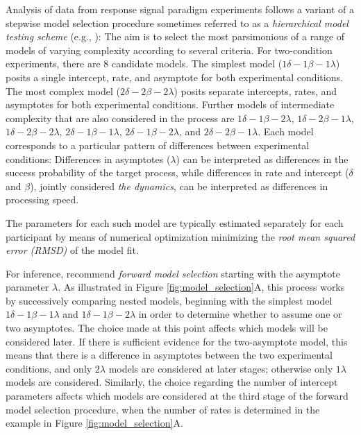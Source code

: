 \documentclass[10pt,letterpaper]{article}
\begin{document}
Analysis of data from response signal paradigm experiments follows a variant of a stepwise model selection procedure sometimes referred to as a \textit{hierarchical model testing scheme} (e.g., ):
The aim is to select the most parsimonious of a range of models of varying complexity according to several criteria. For two-condition experiments, there are 8 candidate models. The simplest model (\(1\delta-1\beta-1\lambda\)) posits a single intercept, rate, and asymptote for both experimental conditions. The most complex model (\(2\delta-2\beta-2\lambda\)) posits separate intercepts, rates, and asymptotes for both experimental conditions. Further models of intermediate complexity that are also considered in the process are \(1\delta-1\beta-2\lambda\), \(1\delta-2\beta-1\lambda\), \(1\delta-2\beta-2\lambda\),
\(2\delta-1\beta-1\lambda\), \(2\delta-1\beta-2\lambda\), and
\(2\delta-2\beta-1\lambda\).
Each model corresponds to a particular pattern of differences between experimental conditions: Differences in asymptotes ($\lambda$) can be interpreted as differences in the success probability of the target process, while differences in rate and intercept ($\delta$ and $\beta$), jointly considered \textit{the dynamics}, can be interpreted as differences in processing speed. 

The parameters for each such model are typically estimated separately for each participant by means of numerical optimization minimizing the \textit{root mean squared error (RMSD)} of the model fit. 

For inference,  recommend \textit{forward model selection} starting with the asymptote parameter $\lambda$. As illustrated in Figure \ref{fig:model_selection}A, this process works by successively comparing nested models, beginning with the simplest model \(1\delta-1\beta-1\lambda\) and \(1\delta-1\beta-2\lambda\) in order to determine whether to assume one or two asymptotes. The choice made at this point affects which models will be considered later. If there is sufficient evidence for the two-asymptote model, this means that there is a difference in asymptotes between the two experimental conditions, and only \(2\lambda\) models are considered at later stages; otherwise only \(1\lambda\) models are considered. Similarly, the choice regarding the number of intercept parameters affects which models are considered at the third stage of the forward model selection procedure, when the number of rates is determined in the example in Figure \ref{fig:model_selection}A.
\end{document}
